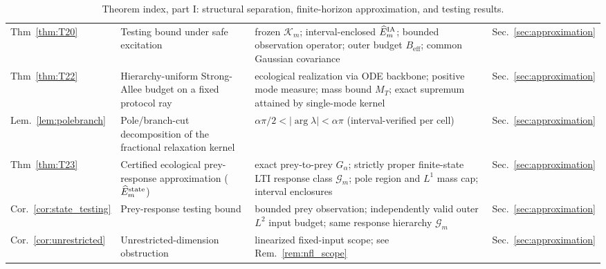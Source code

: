 \begin{table}[ht]
\begin{tabular}{p{1.15cm}p{2.1cm}p{4.85cm}p{1.95cm}}
    Thm~\ref{thm:T20} & Testing bound under safe excitation & frozen $\mathcal K_m$; interval-enclosed $\widehat E_m^{\rm IA}$; bounded observation operator; outer budget $B_{\mathrm{eff}}$; common Gaussian covariance & Sec.~\ref{sec:approximation} \\
    Thm~\ref{thm:T22} & Hierarchy-uniform Strong-Allee budget on a fixed protocol ray & ecological realization via ODE backbone; positive mode measure; mass bound $M_T$; exact supremum attained by single-mode kernel & Sec.~\ref{sec:approximation} \\
    Lem.~\ref{lem:polebranch} & Pole/branch-cut decomposition of the fractional relaxation kernel & $\alpha\pi/2<|\arg\lambda|<\alpha\pi$ (interval-verified per cell) & Sec.~\ref{sec:approximation} \\
    Thm~\ref{thm:T23} & Certified ecological prey-response approximation ($\widehat E_m^{\rm state}$) & exact prey-to-prey $G_\alpha$; strictly proper finite-state LTI response class $\mathcal G_m$; pole region and $L^1$ mass cap; interval enclosures & Sec.~\ref{sec:approximation} \\
    Cor.~\ref{cor:state_testing} & Prey-response testing bound & bounded prey observation; independently valid outer $L^2$ input budget; same response hierarchy $\mathcal G_m$ & Sec.~\ref{sec:approximation} \\
    Cor.~\ref{cor:unrestricted} & Unrestricted-dimension obstruction & linearized fixed-input scope; see Rem.~\ref{rem:nfl_scope} & Sec.~\ref{sec:approximation} \\
    \hline
  \end{tabular}
  \caption{Theorem index, part I: structural separation, finite-horizon approximation, and testing results.}
  \label{tab:theorem_index}
\end{table}

